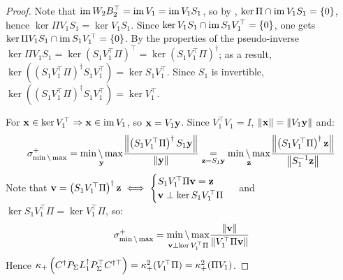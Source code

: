 \begin{proof}
Note that \( \operatorname{im} W_2 B_2^\top = \operatorname{im} V_1 = \operatorname{im} V_1 S_1  \), so by , \( \ker \Pi \cap \operatorname{im} V_1 S_1 = \{ 0 \} \), hence \( \ker \Pi V_1 S_1 = \ker V_1 S_1 \). Since \(\ker V_1 S_1 \cap \operatorname{im} S_1 V_1^\top = \{0\} \), one gets \(\ker \Pi V_1 S_1 \cap \operatorname{im} S_1 V_1^\top = \{0\} \). By the properties of the pseudo-inverse \( \ker \Pi V_1 S_1 = \ker \left( S_1 V_1^\top \Pi \right)^\top = \ker \left( S_1 V_1^\top \Pi \right)^\dagger \); as a result, \( \ker \left( \left( S_1 V_1^\top \Pi \right)^\dagger S_1 V_1^\top \right) = \ker S_1 V_1^\top \). Since \( S_1 \) is invertible, \( \ker \left( \left( S_1 V_1^\top \Pi \right)^\dagger S_1 V_1^\top \right) = \ker V_1^\top \).
 
For \( \mathbf{x} \in \ker V_1^\top \Rightarrow \mathbf{x} \in \operatorname{im} V_1 \), so \( \mathbf{x} = V_1 \mathbf{y} \). Since \( V_1^\top V_1 = I \), \( \| \mathbf{x} \| = \| V_1 \mathbf{y} \| \) and:
\begin{equation*}
      \sigma^+_{\min \backslash \max} =  \underset{ \mathbf{y} }{\min \backslash \max} \frac{ \left\| \left( S_1 V_1^\top \Pi \right)^\dagger S_1 \mathbf{y}  \right\|  }{ \| \mathbf{y} \| } \underset{ \mathbf{z} = S_1 \mathbf{y} }{ = } \underset{ \mathbf{z} }{\min \backslash \max} \frac{ \left\| \left( S_1 V_1^\top \Pi \right)^\dagger \mathbf{z} \right\|  }{ \left\| S_1^{-1} \mathbf{z} \right\| }
\end{equation*}
Note that \( \mathbf{v} = \left( S_1 V_1^\top \Pi \right)^\dagger \mathbf{z} \iff \begin{cases} S_1 V_1^\top \Pi \mathbf{v} = \mathbf{z} \\ \mathbf{v} \perp \ker S_1 V_1^\top \Pi  \end{cases} \) and \( \ker S_1 V_1^\top \Pi = \ker V_1^\top \Pi \), so:
\begin{equation*}
      \sigma^+_{\min \backslash \max} = \underset{ \mathbf{v} \perp \ker V_1^\top \Pi }{\min \backslash \max} \frac{ \| \mathbf{v} \| }{ \| V_1^\top \Pi \mathbf{v} \|  }
\end{equation*}
Hence \( \kappa_+ \left( C^\dagger P_\Sigma L_{1}^{\uparrow} P_\Sigma^\top C^{\dagger \top} \right) = \kappa_+^2 ( V_1^\top \Pi ) = \kappa_+^2 ( \Pi V_1 )\).



\end{proof}

